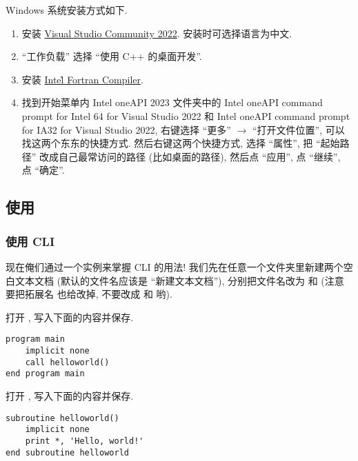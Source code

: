 Windows 系统安装方式如下.
\begin{enumerate}
    \item 安装 \href{https://visualstudio.microsoft.com/zh-hans/thank-you-downloading-visual-studio/?sku=Community&channel=Release&version=VS2022&source=VSLandingPage&cid=2030&passive=false}
    {Visual Studio Community 2022}. 安装时可选择语言为中文.
    \item ``工作负载'' 选择 ``使用 C++ 的桌面开发''.
    \item 安装 \href{https://registrationcenter-download.intel.com/akdlm/IRC_NAS/7feb5647-59dd-420d-8753-345d31e177dc/w_fortran-compiler_p_2024.2.0.424.exe}{Intel\r{} Fortran Compiler}.
    \item 找到开始菜单内 Intel oneAPI 2023 文件夹中的 Intel oneAPI command prompt for Intel 64 for Visual Studio 2022 和 Intel oneAPI command prompt for IA32 for Visual Studio 2022, 右键选择 ``更多'' $\rightarrow$ ``打开文件位置'', 可以找这两个东东的快捷方式. 然后右键这两个快捷方式, 选择 ``属性'', 把 ``起始路径'' 改成自己最常访问的路径 (比如桌面的路径), 然后点 ``应用'', 点 ``继续'', 点 ``确定''.\label{to_desktop}
\end{enumerate}

\subsection{使用}\label{use_ifx}

\subsubsection{使用 CLI}

现在俺们通过一个实例来掌握 CLI 的用法! 我们先在任意一个文件夹里新建两个空白文本文档 (默认的文件名应该是 ``\textsf{新建}\ttt{\ }\textsf{文本文档}''), 分别把文件名改为  和  (注意要把拓展名  也给改掉, 不要改成  和  哟).

打开 , 写入下面的内容并保存.
\begin{lstlisting}
program main
    implicit none
    call helloworld()
end program main
\end{lstlisting}

打开 , 写入下面的内容并保存.
\begin{lstlisting}
subroutine helloworld()
    implicit none
    print *, 'Hello, world!'
end subroutine helloworld
\end{lstlisting}

